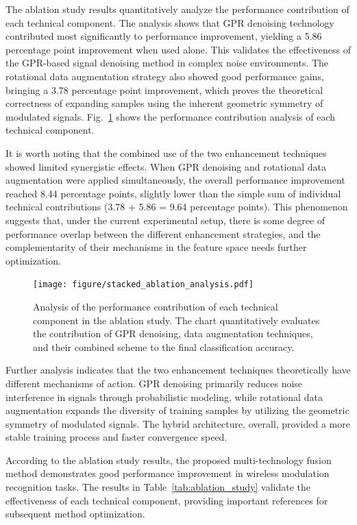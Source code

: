 \documentclass[conference]{IEEEtran}
\begin{document}
The ablation study results quantitatively analyze the performance contribution of each technical component. The analysis shows that GPR denoising technology contributed most significantly to performance improvement, yielding a 5.86 percentage point improvement when used alone. This validates the effectiveness of the GPR-based signal denoising method in complex noise environments. The rotational data augmentation strategy also showed good performance gains, bringing a 3.78 percentage point improvement, which proves the theoretical correctness of expanding samples using the inherent geometric symmetry of modulated signals. Fig.~\ref{fig:ablation_components} shows the performance contribution analysis of each technical component.

It is worth noting that the combined use of the two enhancement techniques showed limited synergistic effects. When GPR denoising and rotational data augmentation were applied simultaneously, the overall performance improvement reached 8.44 percentage points, slightly lower than the simple sum of individual technical contributions (3.78 + 5.86 = 9.64 percentage points). This phenomenon suggests that, under the current experimental setup, there is some degree of performance overlap between the different enhancement strategies, and the complementarity of their mechanisms in the feature space needs further optimization.

\begin{figure}[htbp]
\centering
\texttt{[image: figure/stacked\_ablation\_analysis.pdf]}
\caption{Analysis of the performance contribution of each technical component in the ablation study. The chart quantitatively evaluates the contribution of GPR denoising, data augmentation techniques, and their combined scheme to the final classification accuracy.}
\label{fig:ablation_components}
\end{figure}

Further analysis indicates that the two enhancement techniques theoretically have different mechanisms of action. GPR denoising primarily reduces noise interference in signals through probabilistic modeling, while rotational data augmentation expands the diversity of training samples by utilizing the geometric symmetry of modulated signals. The hybrid architecture, overall, provided a more stable training process and faster convergence speed.

According to the ablation study results, the proposed multi-technology fusion method demonstrates good performance improvement in wireless modulation recognition tasks. The results in Table~\ref{tab:ablation_study} validate the effectiveness of each technical component, providing important references for subsequent method optimization.
\end{document}
